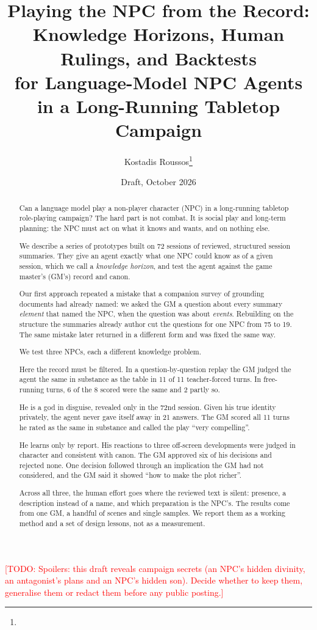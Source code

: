 \documentclass[11pt]{article}
\title{Playing the NPC from the Record:\\
Knowledge Horizons, Human Rulings, and Backtests\\
for Language-Model NPC Agents in a Long-Running Tabletop Campaign}
\author{Kostadis Roussos\thanks{\todo{affiliation, contact}}}
\date{Draft, October 2026}
\newcommand{\todo}[1]{\textcolor{red}{[TODO: #1]}}
\begin{document}
\maketitle

\todo{Spoilers: this draft reveals campaign secrets (an NPC's hidden divinity, an antagonist's
plans and an NPC's hidden son). Decide whether to keep them, generalise them or redact them
before any public posting.}

\begin{abstract}
Can a language model play a non-player character (NPC) in a long-running tabletop
role-playing campaign? The hard part is not combat. It is social play and long-term
planning: the NPC must act on what it knows and wants, and on nothing else.

We describe a series of prototypes built on 72 sessions of reviewed, structured
session summaries. They give an agent exactly what one NPC could know as of a given
session, which we call a \emph{knowledge horizon}, and test the agent against the
game master's (GM's) record and canon.

Our first approach repeated a mistake that a companion survey of grounding documents
had already named: we asked the GM a question about every summary \emph{element} that
named the NPC, when the question was about \emph{events}. Rebuilding on the structure
the summaries already author cut the questions for one NPC from 75 to 19. The same
mistake later returned in a different form and was fixed the same way.

We test three NPCs, each a different knowledge problem.
\begin{description}[nosep]
\item[An NPC who knows less than the record.] Here the record must be filtered. In a
question-by-question replay the GM judged the agent the same in substance as the
table in 11 of 11 teacher-forced turns. In free-running turns, 6 of the 8 scored were
the same and 2 partly so.
\item[An NPC who knows more than the record.] He is a god in disguise, revealed only
in the 72nd session. Given his true identity privately, the agent never gave itself
away in 21 answers. The GM scored all 11 turns he rated as the same in substance and
called the play ``very compelling''.
\item[An NPC who is never present.] He learns only by report. His reactions to three
off-screen developments were judged in character and consistent with canon. The GM
approved six of his decisions and rejected none. One decision followed through an
implication the GM had not considered, and the GM said it showed ``how to make the
plot richer''.
\end{description}

Across all three, the human effort goes where the reviewed text is silent:
presence, a description instead of a name, and which preparation is the NPC's. The
results come from one GM, a handful of scenes and single samples. We report them as a
working method and a set of design lessons, not as a measurement.
\end{abstract}
\end{document}
